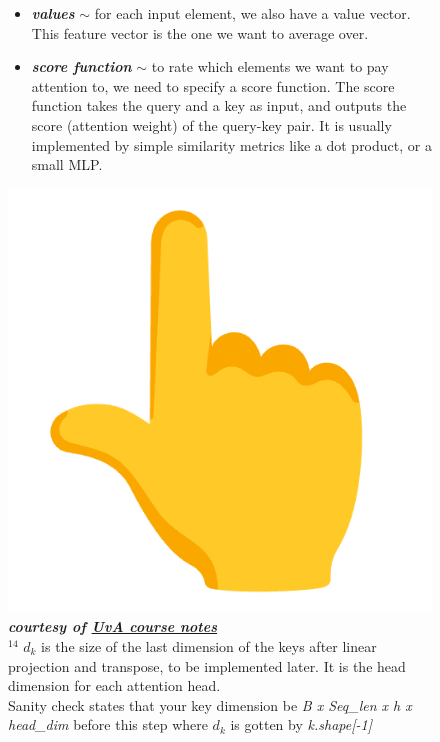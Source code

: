 \documentclass[12pt]{article}
\begin{document}
\begin{figure}[!htb]
\begin{minipage}[t]{.4\textwidth}
\begin{itemize}[left=0pt,topsep=0pt,itemsep=-1ex,parsep=0ex]
        \item \textbf{\textit{values}} {\tiny $\sim$} for each input element, we also have a value vector. This feature vector is the one we want to average over.
        \item \textbf{\textit{score function}} {\tiny $\sim$} to rate which elements we want to pay attention to, we need to specify a score function. The score function 
        takes the query and a key as input, and outputs the score (attention weight) of the query-key pair. It is usually implemented by simple similarity metrics like 
        a dot product, or a small MLP.
    \end{itemize}
    \includegraphics[width=.1\textwidth]{images/hand-point-up.png}
    \textbf{
                \textit{courtesy of \href{https://uvadlc-notebooks.readthedocs.io/en/latest/tutorial_notebooks/tutorial6/Transformers_and_MHAttention.html}{UvA course notes}}
                }\\
    \vspace{2em}
    $^{14}$ $d_k$ is the size of the last dimension of the keys after linear projection and transpose, to be implemented later.
    It is the head dimension for each attention head.\\ 
    Sanity check states that your key dimension be {\it B x Seq\_len x h x head\_dim}
    before this step where $d_k$ is gotten by {\it k.shape[-1]}
\end{minipage}
\end{figure}
\pagebreak 
\end{document}
